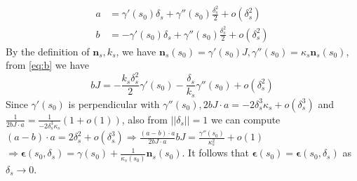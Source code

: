 \documentclass{article}
\begin{document}
\begin{enumerate}
\begin{subequations}
\begin{align}
\label{eq:a}a & = \gamma'(s_0) \delta_s + \gamma''(s_0)\frac{\delta_s^2}{2} +o(\delta_s^2)\\
\label{eq:b}b & = -\gamma'(s_0) \delta_s + \gamma''(s_0)\frac{\delta_s^2}{2} +o(\delta_s^2)
\end{align}
\end{subequations}
By the definition of $\bm{n}_s,k_s$, we have $\bm{n}_s(s_0) =\gamma'(s_0)J,\gamma''(s_0)=\kappa_s \bm{n}_s(s_0)$, from \eqref{eq:b} we have
\begin{equation}
bJ = -\frac{k_s \delta_s^2}{2} \gamma'(s_0) -\frac{\delta_s}{k_s}\gamma''(s_0)+ o(\delta_s^2) 
\end{equation}
Since $\gamma'(s_0)$ is perpendicular with $\gamma''(s_0),2bJ\cdot a=-2\delta_s^3 \kappa_s + o(\delta_s^3)$ and $\frac{1}{2bJ\cdot a} =\frac{1}{-2\delta_s^3 \kappa_s}(1+o(1))$, also from $||\delta_s||=1$ we can compute $(a-b)\cdot a = 2\delta_s^2 + o(\delta_s^3)\Rightarrow \frac{(a-b)\cdot a }{2bJ\cdot a}bJ = \frac{\gamma''(s_0)}{\kappa^2_s}+o(1)$$\Rightarrow \bm{\epsilon}(s_0,\delta_s)=\gamma(s_0)+\frac{1}{\kappa_s(s_0)}\bm{n}_s(s_0)$. It follows that $\bm{\epsilon}(s_0)=\bm{\epsilon}(s_0,\delta_s)$ as $\delta_s\to 0$.

\end{enumerate}
\end{document}
